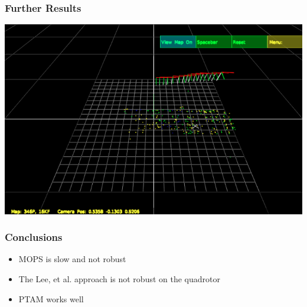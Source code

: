 \documentclass[xcolor=x11names,compress,t]{beamer}
\renewcommand{\(}{\begin{columns}}
\renewcommand{\)}{\end{columns}}
\newcommand{\<}[1]{\begin{column}{#1}}
\renewcommand{\>}{\end{column}}
\begin{document}
\begin{frame}
  \frametitle{Further Results}
  \begin{center}
    \includegraphics[resolution=150, scale=0.4]{images/ptam-map}
  \end{center}
\end{frame}

\begin{frame}
  \frametitle{Conclusions}
  \begin{itemize}
  \item MOPS is slow and not robust
  \item The Lee, et al. approach is not robust on the quadrotor
  \item PTAM works well
  \end{itemize}
\end{frame}

\end{document}
